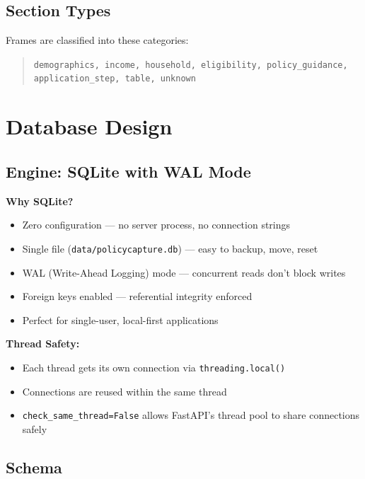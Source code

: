 \documentclass[12pt, a4paper]{article}
\newcommand{\codeinline}[1]{\texttt{\small\colorbox{codebg}{#1}}}
\begin{document}
\subsection{Section Types}

Frames are classified into these categories:

\begin{quote}
\texttt{demographics, income, household, eligibility, policy\_guidance, application\_step, table, unknown}
\end{quote}

\section{Database Design}

\subsection{Engine: SQLite with WAL Mode}

\textbf{Why SQLite?}
\begin{itemize}
    \item Zero configuration --- no server process, no connection strings
    \item Single file (\codeinline{data/policycapture.db}) --- easy to backup, move, reset
    \item WAL (Write-Ahead Logging) mode --- concurrent reads don't block writes
    \item Foreign keys enabled --- referential integrity enforced
    \item Perfect for single-user, local-first applications
\end{itemize}

\textbf{Thread Safety:}
\begin{itemize}
    \item Each thread gets its own connection via \codeinline{threading.local()}
    \item Connections are reused within the same thread
    \item \codeinline{check\_same\_thread=False} allows FastAPI's thread pool to share connections safely
\end{itemize}

\subsection{Schema}
\end{document}
